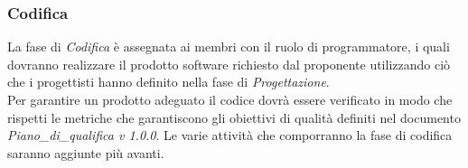 	\subsubsection{Codifica}
	La fase di \textit{Codifica} è assegnata ai membri con il ruolo di programmatore, i quali dovranno realizzare il prodotto software richiesto dal proponente utilizzando ciò che i progettisti hanno definito nella fase di \textit{Progettazione}.\\
	Per garantire un prodotto adeguato il codice dovrà essere verificato in modo che rispetti le metriche che garantiscono gli obiettivi di qualità definiti nel documento \textit{Piano\_di\_qualifica v 1.0.0}.
	Le varie attività che comporranno la fase di codifica saranno aggiunte più avanti. 

    
    
